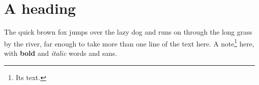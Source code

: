 \documentclass[12pt]{article}
\begin{document}
\section{A heading}
The quick brown fox jumps over the lazy dog and runs on through the long grass by the river, far enough to take more than one line of the text here. A note\footnote{Its text.} here, with \textbf{bold} and \textit{italic} words and \textsf{sans}.
\end{document}
